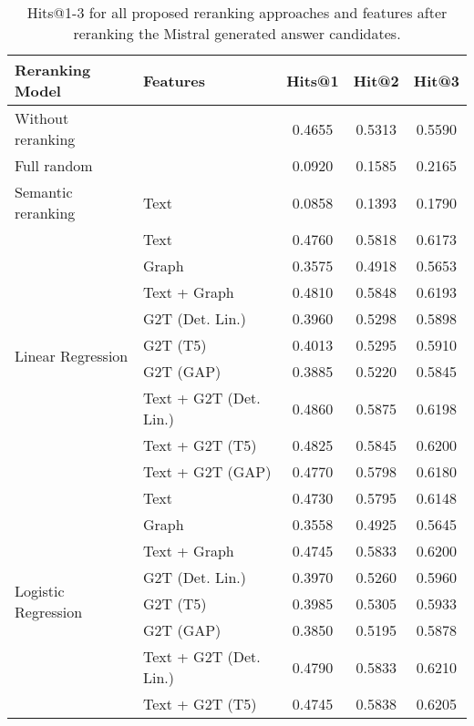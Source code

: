 \begin{table}[htbp]
    \setlength{\tabcolsep}{3pt}
    \caption{Hits@1-3 for all proposed reranking approaches and features after reranking the Mistral generated answer candidates.}
    \label{tab:controllable_fusion:mistral_all_results}
    \fontsize{9pt}{11pt}\selectfont
    \centering
    \begin{tabular}{l p{5cm} c c c}
        \toprule
        \textbf{Reranking Model} & \textbf{Features} & \textbf{Hits@1} & \textbf{Hit@2} & \textbf{Hit@3} \\
        \midrule
        Without reranking & & 0.4655 & 0.5313 & 0.5590 \\
        \cmidrule(lr){1-5}
        Full random & & 0.0920 & 0.1585 & 0.2165 \\
        \cmidrule(lr){1-5}
        Semantic reranking & Text & 0.0858 & 0.1393 & 0.1790 \\
        \cmidrule(lr){1-5}
        \multirow{9}{*}{Linear Regression} & Text & 0.4760 & 0.5818 & 0.6173 \\
        & Graph & 0.3575 & 0.4918 & 0.5653 \\
        & Text + Graph & 0.4810 & 0.5848 & 0.6193 \\
        & G2T (Det. Lin.) & 0.3960 & 0.5298 & 0.5898 \\
        & G2T (T5) & 0.4013 & 0.5295 & 0.5910 \\
        & G2T (GAP) & 0.3885 & 0.5220 & 0.5845 \\
        & Text + G2T (Det. Lin.) & 0.4860 & 0.5875 & 0.6198 \\
        & Text + G2T (T5) & 0.4825 & 0.5845 & 0.6200 \\
        & Text + G2T (GAP) & 0.4770 & 0.5798 & 0.6180 \\
        \midrule
        \multirow{12}{*}{Logistic Regression} & Text & 0.4730 & 0.5795 & 0.6148 \\
        & Graph & 0.3558 & 0.4925 & 0.5645 \\
        & Text + Graph & 0.4745 & 0.5833 & 0.6200 \\
        & G2T (Det. Lin.) & 0.3970 & 0.5260 & 0.5960 \\
        & G2T (T5) & 0.3985 & 0.5305 & 0.5933 \\
        & G2T (GAP) & 0.3850 & 0.5195 & 0.5878 \\
        & Text + G2T (Det. Lin.) & 0.4790 & 0.5833 & 0.6210 \\
        & Text + G2T (T5) & 0.4745 & 0.5838 & 0.6205 \\

\end{tabular}
\end{table}
